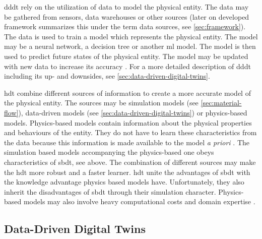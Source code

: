 \gls{dddt} rely on the utilization of data to model the physical entity. The data may be gathered from sensors, data warehouses or other sources (later on developed framework summarizes this under the term data sources, see \autoref{sec:framework}). The data is used to train a model which represents the physical entity. The model may be a neural network, a decision tree or another \gls{ml} model. The model is then used to predict future states of the physical entity. The model may be updated with new data to increase its accuracy \autocite{he2019data,Friederich2022}. For a more detailed description of \gls{dddt} including its up- and downsides, see \autoref{sec:data-driven-digital-twins}.

\gls{hdt} combine different sources of information to create a more accurate model of the physical entity. The sources may be simulation models (see \autoref{sec:material-flow}), data-driven models (see \autoref{sec:data-driven-digital-twins}) or physics-based models. Physics-based models contain information about the physical properties and behaviours of the entity. They do not have to learn these characteristics from the data because this information is made available to the model \textit{a priori} \autocite{kapteyn2022data,aivaliotis2019methodology}. The simulation based models accompanying the physics-based one obeys characteristics of \gls{sbdt}, see above. The combination of different sources may make the \gls{hdt} more robust and a faster learner. \gls{hdt} unite the advantages of \gls{sbdt} with the knowledge advantage physics based models have. Unfortunately, they also inherit the disadvantages of \gls{sbdt} through their simulation character. Physics-based models may also involve heavy computational costs and domain expertise \autocite{kapteyn2022data}.

\subsection*{Data-Driven Digital Twins}
\label{sec:data-driven-digital-twins}

